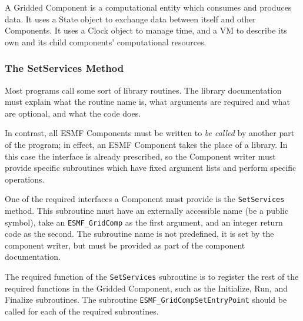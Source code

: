 %


A Gridded Component is a computational entity which consumes 
and produces data.  It uses a State object to exchange data 
between itself and other Components.  It uses a Clock object 
to manage time, and a VM to describe its own and its child
components' computational resources.

\subsubsection{The SetServices Method}

Most programs call some sort of library routines.  The library
documentation must explain what the routine name is, what arguments 
are required and what are optional, and what the code does.  

In contrast, all ESMF Components must be written to {\it be called}
by another part of the program; in effect, an ESMF Component takes the 
place of a library.  In this case the interface is already prescribed,
so the Component writer must provide specific subroutines which 
have fixed argument lists and perform specific operations.

One of the required interfaces a Component must provide is 
the {\tt SetServices} method.  This subroutine must have an
externally accessible name (be a public symbol), take an {\tt ESMF\_GridComp}
as the first argument, and an integer return code as the second.
The subroutine name is not predefined, it is set by the component
writer, but must be provided as part of the component documentation.

The required function of the {\tt SetServices} subroutine is to
register the rest of the required functions in the Gridded Component,
such as the Initialize, Run, and Finalize subroutines.  The subroutine
{\tt ESMF\_GridCompSetEntryPoint} should be called for
each of the required subroutines.  

